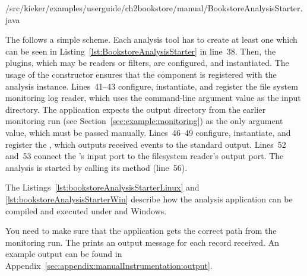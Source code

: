 
\setJavaCodeListing
%
{\manualInstrumentedBookstoreApplicationDir/src/kieker/examples/userguide/ch2bookstore/manual/BookstoreAnalysisStarter.java}


\noindent The  follows a simple scheme. Each %
analysis tool has to create at least one  which can be %
seen in Listing~\ref{lst:BookstoreAnalysisStarter} in line~38. Then, the plugins, %
which may be readers or filters, are configured, and instantiated. The usage of the  %
constructor ensures that the component is registered with the analysis instance. %
Lines~41--43 configure, instantiate, and register the file system monitoring %
log reader, which uses the command-line argument value as the input directory. %
The application expects the %
output directory from the earlier monitoring run (see Section~\ref{sec:example:monitoring}) %
as the only argument value, which must be passed manually. %
Lines~46--49 configure, instantiate, and register the , %
which outputs received events to the standard output. Lines~52 and~53 connect %
the 's input port to the filesystem reader's output port. %
The analysis is started by calling its  method (line~56). %


The Listings~\ref{lst:bookstoreAnalysisStarterLinux} and \ref{lst:bookstoreAnalysisStarterWin} %
describe how the analysis application can be compiled and executed under \UnixLikeSystems{} and Windows.

\setBashListing
\enlargethispage{1.0cm}




\noindent You need to make sure that the application gets the correct path from the monitoring run.
The  prints an output message for each record received. %
An example output can be found in Appendix~\ref{sec:appendix:manualInstrumentation:output}.

